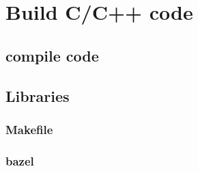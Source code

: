 \chapter{Build C/C++ code}

\section{compile code} 


\section{Libraries} 

\subsection{Makefile} 

\subsection{bazel} 

